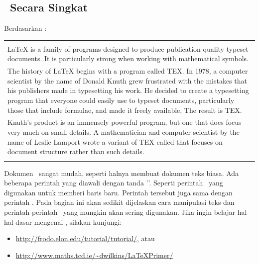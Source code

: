 \subsection{\latex~Secara Singkat}
\label{sec:latexBrief}
Berdasarkan \cite{latex:intro}: \\
\begin{tabular}{| p{13cm} |}
	\hline
	\\
	LaTeX is a family of programs designed to produce publication-quality typeset documents. It is particularly strong when working with mathematical symbols.                                                                                                                                                                                                                                      \\
	The history of LaTeX begins with a program called TEX. In 1978, a computer scientist by the name of Donald Knuth grew frustrated with the mistakes that his publishers made in typesetting his work. He decided to create a typesetting program that everyone could easily use to typeset documents, particularly those that include formulae, and made it freely available. The result is TEX. \\
	Knuth's product is an immensely powerful program, but one that does focus very much on small details. A mathematician and computer scientist by the name of Leslie Lamport wrote a variant of TEX called  that focuses on document structure rather than such details.                                                                                                                          \\
	\\
	\hline
\end{tabular}

\vspace*{0.8cm}

Dokumen \latex~sangat mudah, seperti halnya membuat dokumen teks biasa.
Ada beberapa perintah yang diawali dengan tanda '\bslash'.
Seperti perintah \code{\bslash\bslash}~yang digunakan untuk memberi baris baru.
Perintah tersebut juga sama dengan perintah .
Pada bagian ini akan sedikit dijelaskan cara manipulasi teks dan perintah-perintah \latex~yang mungkin akan sering digunakan.
Jika ingin belajar hal-hal dasar mengenai \latex, silakan kunjungi:

\begin{itemize}
	\item \url{http://frodo.elon.edu/tutorial/tutorial/}, atau
	\item \url{http://www.maths.tcd.ie/~dwilkins/LaTeXPrimer/}
\end{itemize}


